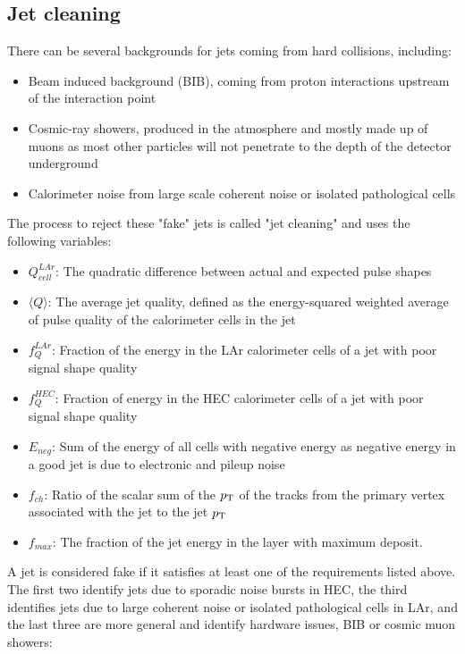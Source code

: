 \subsection{Jet cleaning}
\label{section:jetcleaning}

There can be several backgrounds for jets coming from hard collisions, including\cite{jetCleaning}:

\begin{itemize}
	\item Beam induced background (BIB), coming from proton interactions upstream of the interaction point
	\item Cosmic-ray showers, produced in the atmosphere and mostly made up of muons as most other particles will not penetrate to the depth of the detector underground
	\item Calorimeter noise from large scale coherent noise or isolated pathological cells
\end{itemize}

The process to reject these "fake" jets is called "jet cleaning" and uses the following variables:

\begin{itemize}
	\item $Q^{LAr}_{cell}$: The quadratic difference between actual and expected pulse shapes
	\item $\langle Q \rangle$: The average jet quality, defined as the energy-squared weighted average of pulse quality of the calorimeter cells in the jet
	\item $f_{Q}^{LAr}$: Fraction of the energy in the LAr calorimeter cells of a jet with poor signal shape quality
	\item $f_{Q}^{HEC}$: Fraction of energy in the HEC calorimeter cells of a jet with poor signal shape quality
	\item $E_{neg}$: Sum of the energy of all cells with negative energy as negative energy in a good jet is due to electronic and pileup noise
	\item $f_{ch}$: Ratio of the scalar sum of the $p_{\mathrm{T}}$ of the tracks from the primary vertex associated with the jet to the jet $p_{\mathrm{T}}$
	\item $f_{max}$: The fraction of the jet energy in the layer with maximum deposit.
\end{itemize}

A jet is considered fake if it satisfies at least one of the %
requirements listed above.  The first two identify jets due to sporadic noise bursts in HEC, the third identifies jets due to large coherent noise or isolated pathological cells in LAr, and the last three are more general and identify hardware issues, BIB or cosmic muon showers:

